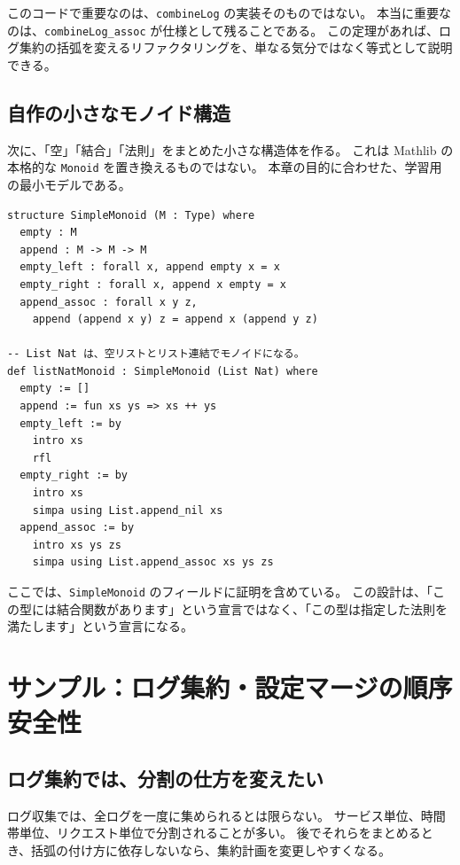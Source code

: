 このコードで重要なのは、\texttt{combineLog} の実装そのものではない。
本当に重要なのは、\texttt{combineLog\_assoc} が仕様として残ることである。
この定理があれば、ログ集約の括弧を変えるリファクタリングを、単なる気分ではなく等式として説明できる。

\subsection{自作の小さなモノイド構造}

次に、「空」「結合」「法則」をまとめた小さな構造体を作る。
これは Mathlib の本格的な \texttt{Monoid} を置き換えるものではない。
本章の目的に合わせた、学習用の最小モデルである。

\begin{listing}[htbp]
\begin{verbatim}
structure SimpleMonoid (M : Type) where
  empty : M
  append : M -> M -> M
  empty_left : forall x, append empty x = x
  empty_right : forall x, append x empty = x
  append_assoc : forall x y z,
    append (append x y) z = append x (append y z)

-- List Nat は、空リストとリスト連結でモノイドになる。
def listNatMonoid : SimpleMonoid (List Nat) where
  empty := []
  append := fun xs ys => xs ++ ys
  empty_left := by
    intro xs
    rfl
  empty_right := by
    intro xs
    simpa using List.append_nil xs
  append_assoc := by
    intro xs ys zs
    simpa using List.append_assoc xs ys zs
\end{verbatim}
\caption{学習用の小さなモノイド構造}
\label{lst:ch10_simple_monoid}
\end{listing}

ここでは、\texttt{SimpleMonoid} のフィールドに証明を含めている。
この設計は、「この型には結合関数があります」という宣言ではなく、「この型は指定した法則を満たします」という宣言になる。

\section{サンプル：ログ集約・設定マージの順序安全性}

\subsection{ログ集約では、分割の仕方を変えたい}

ログ収集では、全ログを一度に集められるとは限らない。
サービス単位、時間帯単位、リクエスト単位で分割されることが多い。
後でそれらをまとめるとき、括弧の付け方に依存しないなら、集約計画を変更しやすくなる。

